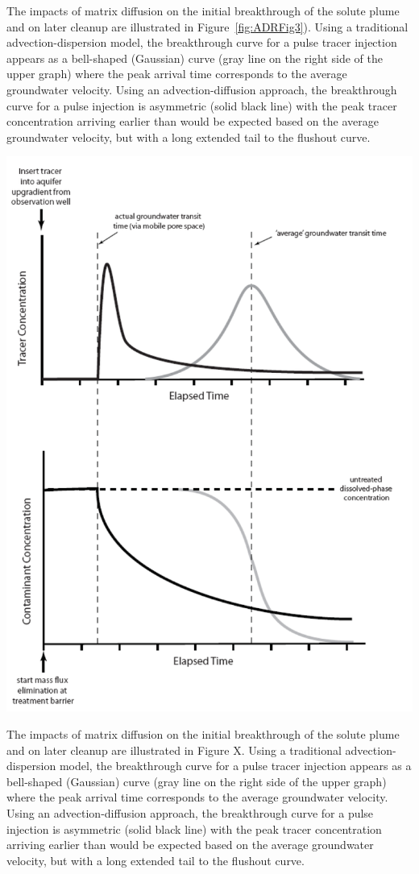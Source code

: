\documentclass{tufte-handout}\usepackage[]{graphicx}\usepackage[]{xcolor}
\begin{document}
The impacts of matrix diffusion on the initial breakthrough of the solute plume and on later cleanup are illustrated in Figure~\ref{fig:ADRFig3}). Using a traditional advection-dispersion model, the breakthrough curve for a pulse tracer injection appears as a bell-shaped (Gaussian) curve (gray line on the right side of the upper graph) where the peak arrival time corresponds to the average groundwater velocity. Using an advection-diffusion approach, the breakthrough curve for a pulse injection is asymmetric (solid black line) with the peak tracer concentration arriving earlier than would be expected based on the average groundwater velocity, but with a long extended tail to the flushout curve.
\begin{marginfigure}
\includegraphics[width=1.0\textwidth]{graphics/ADRFig3.png}
\caption{The impacts of matrix diffusion on the initial breakthrough of the solute plume and on later cleanup are illustrated in Figure X. Using a traditional advection-dispersion model, the breakthrough curve for a pulse tracer injection appears as a bell-shaped (Gaussian) curve (gray line on the right side of the upper graph) where the peak arrival time corresponds to the average groundwater velocity. Using an advection-diffusion approach, the breakthrough curve for a pulse injection is asymmetric (solid black line) with the peak tracer concentration arriving earlier than would be expected based on the average groundwater velocity, but with a long extended tail to the flushout curve.}
\label{fig:ADRFig3}
\end{marginfigure}
\end{document}
